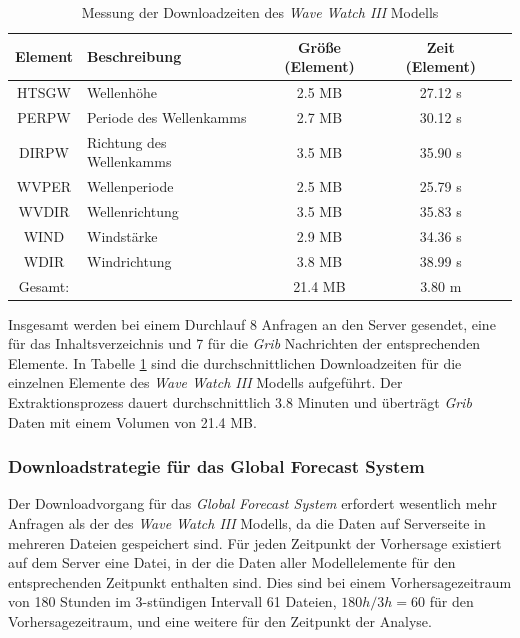 \begin{table}[h]
  \centering
  {\sf
    \footnotesize
    \begin{longtable}{@{}clccc}
      \toprule
      \textbf{Element} & \textbf{Beschreibung} & \textbf{Größe (Element)} & \textbf{Zeit (Element)}  \\
      \midrule
      HTSGW & Wellenhöhe & 2.5 MB & 27.12 s \\
      PERPW & Periode des Wellenkamms & 2.7 MB & 30.12 s \\
      DIRPW & Richtung des Wellenkamms & 3.5 MB & 35.90 s \\
      WVPER & Wellenperiode & 2.5 MB & 25.79 s \\
      WVDIR & Wellenrichtung & 3.5 MB & 35.83 s \\
      WIND  & Windstärke & 2.9 MB & 34.36 s \\
      WDIR  & Windrichtung & 3.8 MB & 38.99 s \\
      \midrule
      Gesamt: & & 21.4 MB & 3.80 m \\
      \bottomrule
    \end{longtable}
  }
  \caption{Messung der Downloadzeiten des \textit{Wave Watch III} Modells}
  \label{tab:download_messung_ww3}
\end{table}

Insgesamt werden bei einem Durchlauf 8 Anfragen an den Server
gesendet, eine für das Inhaltsverzeichnis und 7 für die \textit{Grib}
Nachrichten der entsprechenden Elemente. In Tabelle
\ref{tab:download_messung_ww3} sind die durchschnittlichen
Downloadzeiten für die einzelnen Elemente des \textit{Wave Watch III}
Modells aufgeführt. Der Extraktionsprozess dauert durchschnittlich 3.8
Minuten und überträgt \textit{Grib} Daten mit einem Volumen von 21.4
MB.

\subsubsection{Downloadstrategie für das Global Forecast System}

Der Downloadvorgang für das \textit{Global Forecast System} erfordert
wesentlich mehr Anfragen als der des \textit{Wave Watch III} Modells,
da die Daten auf Serverseite in mehreren Dateien gespeichert sind. Für
jeden Zeitpunkt der Vorhersage existiert auf dem Server eine Datei, in
der die Daten aller Modellelemente für den entsprechenden Zeitpunkt
enthalten sind. Dies sind bei einem Vorhersagezeitraum von 180 Stunden
im 3-stündigen Intervall 61 Dateien, $180h / 3h = 60$ für den
Vorhersagezeitraum, und eine weitere für den Zeitpunkt der Analyse.

